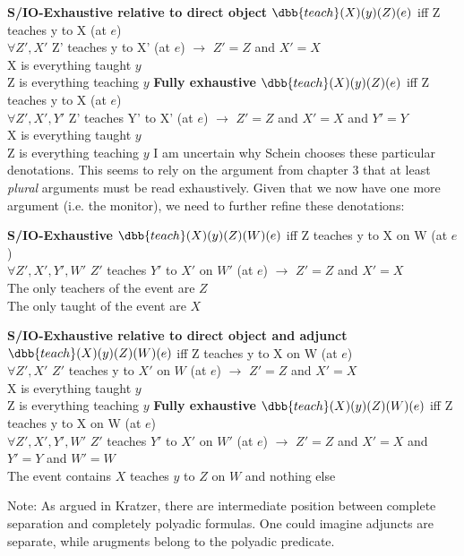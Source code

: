 \documentclass[english]{article}
\begin{document}
\pex \textbf{S/IO-Exhaustive relative to direct object}
\a 
$\dbb{teach}(X)(y)(Z)(e)$ iff Z teaches y to X (at $e$)\\
$\forall Z', X'$ Z' teaches y to X' (at $e$) $\rightarrow$ $Z'=Z$ and $X'=X$\\
\a 
X is everything taught $y$\\
Z is everything teaching $y$
\xe
%
\pex \textbf{Fully exhaustive}
\a 
$\dbb{teach}(X)(y)(Z)(e)$ iff Z teaches y to X (at $e$)\\
$\forall Z', X', Y'$ Z' teaches Y' to X' (at $e$) $\rightarrow$ $Z'=Z$ and $X'=X$ and $Y'=Y$\\
\a 
X is everything taught $y$\\
Z is everything teaching $y$
\xe
%
I am uncertain why Schein chooses these particular denotations. This seems to rely on the argument from chapter 3 that at least \emph{plural} arguments must be read exhaustively. Given that we now have one more argument (i.e. the monitor), we need to further refine these denotations:

\pex \textbf{S/IO-Exhaustive}
\a 
$\dbb{teach}(X)(y)(Z)(W)(e)$ iff Z teaches y to X on W (at $e$)\\
$\forall Z', X', Y', W'$ $Z'$ teaches $Y'$ to $X'$ on $W'$ (at $e$) $\rightarrow$ $Z'=Z$ and $X'=X$\\
\a 
The only teachers of the event are $Z$\\
The only taught of the event are $X$
\xe
%

\pex \textbf{S/IO-Exhaustive relative to direct object and adjunct}
\a 
$\dbb{teach}(X)(y)(Z)(W)(e)$ iff Z teaches y to X on W (at $e$)\\
$\forall Z', X'$ $Z'$ teaches y to $X'$ on $W$ (at $e$) $\rightarrow$ $Z'=Z$ and $X'=X$\\
\a 
X is everything taught $y$\\
Z is everything teaching $y$
\xe
%
\pex \textbf{Fully exhaustive}
\a 
$\dbb{teach}(X)(y)(Z)(W)(e)$ iff Z teaches y to X on W (at $e$)\\
$\forall Z', X', Y', W'$ $Z'$ teaches $Y'$ to $X'$ on $W'$ (at $e$) $\rightarrow$ $Z'=Z$ and $X'=X$ and $Y'=Y$ and $W' = W$\\
\a 
The event contains $X$ teaches $y$ to $Z$ on $W$ and nothing else
\xe
%


Note: As argued in Kratzer, there are intermediate position between complete separation and completely polyadic formulas. One could imagine adjuncts are separate, while arugments belong to the polyadic predicate.
\end{document}
